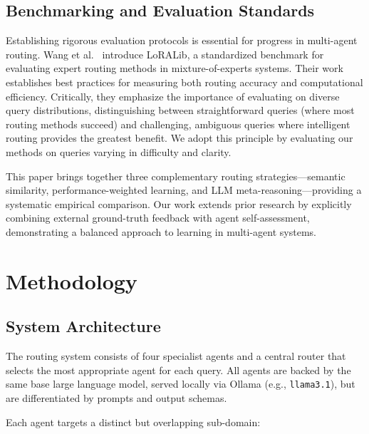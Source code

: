 \documentclass[11pt]{article}
\begin{document}
\subsection{Benchmarking and Evaluation Standards}

Establishing rigorous evaluation protocols is essential for progress in multi-agent routing. Wang et al.\ \cite{Wang2025} introduce LoRALib, a standardized benchmark for evaluating expert routing methods in mixture-of-experts systems. Their work establishes best practices for measuring both routing accuracy and computational efficiency. Critically, they emphasize the importance of evaluating on diverse query distributions, distinguishing between straightforward queries (where most routing methods succeed) and challenging, ambiguous queries where intelligent routing provides the greatest benefit. We adopt this principle by evaluating our methods on queries varying in difficulty and clarity.

This paper brings together three complementary routing strategies—semantic similarity, performance-weighted learning, and LLM meta-reasoning—providing a systematic empirical comparison. Our work extends prior research by explicitly combining external ground-truth feedback with agent self-assessment, demonstrating a balanced approach to learning in multi-agent systems.

\section{Methodology}

\subsection{System Architecture}

The routing system consists of four specialist agents and a central router that selects the most appropriate agent for each query. All agents are backed by the same base large language model, served locally via Ollama (e.g., \texttt{llama3.1}), but are differentiated by prompts and output schemas.

\singlespacing

Each agent targets a distinct but overlapping sub-domain:
\end{document}
